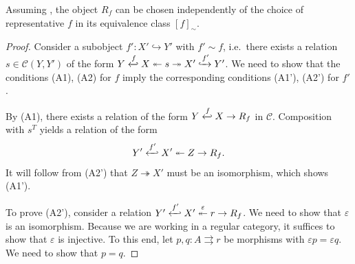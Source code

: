 \documentclass[11pt]{amsart}
\newcommand\Cref[1]{\zcref[S]{#1}}
\theoremstyle{definition}
\theoremstyle{remark}
\newcommand\cC{\mathcal C}
\renewcommand\:\colon
\renewcommand\:\colon
\newcommand\eps{\varepsilon}
\newcommand\tto{\twoheadrightarrow}
\begin{document}
\begin{lemma} \label{l:equivalent-assumption}
    Assuming \Cref{a:rank-object}, the object $R_f$ can be chosen independently of the choice of representative $f$ in its equivalence class $[f]_{\sim}$.
\end{lemma}
\begin{proof}
    Consider a subobject $f': X' \hookrightarrow Y'$ with $f' \sim f$, i.e.~there exists a relation $s \in \cC(Y, Y')$ of the form $Y \xhookleftarrow{f} X \stackrel{}{\twoheadleftarrow} s \stackrel{}{\tto} X' \xhookrightarrow{f'} Y'$. We need to show that the conditions (A1), (A2) for $f$ imply the corresponding conditions (A1'), (A2') for $f'$.
    
    By (A1), there exists a relation of the form $Y \xhookleftarrow{f} X \to R_f$ in $\cC$. Composition with $s^T$ yields a relation of the form
    \[
        Y' \xhookleftarrow{f'} X' \twoheadleftarrow Z \to R_f.
    \]
    It will follow from (A2') that $Z \tto X'$ must be an isomorphism, which shows (A1').
    
    To prove (A2'), consider a relation $Y' \xhookleftarrow{f'} X' \stackrel{\eps}{\twoheadleftarrow} r \to R_f$. We need to show that $\eps$ is an isomorphism. Because we are working in a regular category, it suffices to show that $\eps$ is injective. To this end, let $p, q: A \rightrightarrows r$ be morphisms with $\eps p = \eps q$. We need to show that $p = q$.
    

\end{proof}
\end{document}
